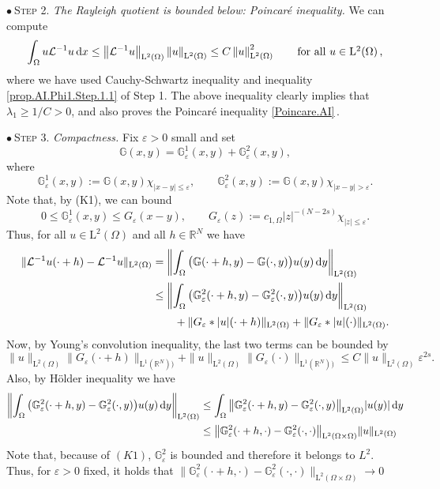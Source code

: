 \documentclass[11pt]{article}
\numberwithin{equation}{section}
\newcommand{\dx}{\,{\rm d}x}
\newcommand{\dy}{\,{\rm d}y}
\def\LL{\mathrm{L}} %
\newcommand{\AI}{\mathcal{L}^{-1}}
\newcommand{\K}{{\mathbb G}}
\newcommand{\ve}{\varepsilon}
\begin{document}
\noindent$\bullet~$\textsc{Step 2. }\textit{The Rayleigh quotient is bounded below: Poincar\'e inequality. }We can compute
\begin{equation}\label{prop.AI.Phi1.Step.1.5b}
\int_\Omega u\AI u\dx\le \left\|\AI u\right\|_{\LL^2(\Omega)} \left\|  u\right\|_{\LL^2(\Omega)} \le C  \left\|  u\right\|_{\LL^2(\Omega)}^2\qquad\mbox{for all $u\in\LL^2(\Omega)$\,,}
\end{equation}
where we have used Cauchy-Schwartz inequality and inequality \eqref{prop.AI.Phi1.Step.1.1} of Step 1.
The above inequality clearly implies that $\lambda_1\ge 1/C>0$, and also proves the Poincar\'e inequality \eqref{Poincare.AI}\,.

\noindent$\bullet~$\textsc{Step 3. }\textit{Compactness. }
Fix $\ve>0$ small and set
$$
\K(x,y)=\K_\ve^1(x,y)+\K_\ve^2(x,y),
$$
where
$$
\K_\ve^1(x,y):=\K(x,y)\chi_{|x-y|\leq \ve},\qquad
\K_\ve^2(x,y):=\K(x,y)\chi_{|x-y|> \ve}.
$$
Note that, by (K1), we can bound
$$
0\leq \K_\ve^1(x,y)\leq G_\ve(x-y),\qquad
G_\ve(z):=c_{1,\Omega}|z|^{-(N-2s)}\chi_{|z|\leq \ve}.
$$
Thus,
for all $u\in \LL^2(\Omega)$ and all $h \in \mathbb R^N$ we have
\begin{equation}\begin{split}\label{step4.Phi.n}
\|\AI u(\cdot+h)-\AI u \|_{\LL^2(\Omega)}&
=\biggl\|\int_{\Omega}\big(\K(\cdot+h,y)-\K(\cdot,y)\big) u(y)\dy\biggr\|_{\LL^2(\Omega)}\\
&\leq \biggl\|\int_{\Omega}\big(\K_\ve^2(\cdot+h,y)-\K_\ve^2(\cdot,y)\big) u(y)\dy\biggr\|_{\LL^2(\Omega)}\\
&\qquad
+\|G_\ve\ast |u|(\cdot +h)\|_{\LL^2(\Omega)}
+\|G_\ve\ast |u|(\cdot)\|_{\LL^2(\Omega)}.
\end{split}
\end{equation}
Now, by Young's convolution inequality, the last two terms can be bounded by
$$
\|u\|_{\LL^2(\Omega)}\|G_\ve(\cdot +h)\|_{\LL^1(\mathbb R^N))}
+\|u\|_{\LL^2(\Omega)}\|G_\ve(\cdot)\|_{\LL^1(\mathbb R^N))}\leq C\|u\|_{\LL^2(\Omega)}\ve^{2s}.
$$
Also, by H\"older inequality we have
\begin{align*}
\biggl\|\int_{\Omega}\big(\K_\ve^2(\cdot+h,y)-\K_\ve^2(\cdot,y)\big) u(y)\dy\biggr\|_{\LL^2(\Omega)}&
\leq \int_{\Omega}\big\|\K_\ve^2(\cdot+h,y)-\K_\ve^2(\cdot,y)\big\|_{\LL^2(\Omega)} |u(y)|\dy\\
&\leq \big\|\K_\ve^2(\cdot+h,\cdot)-\K_\ve^2(\cdot,\cdot)\big\|_{\LL^2(\Omega\times \Omega)} \|u\|_{\LL^2(\Omega)}
\end{align*}
Note that, because of $(K1)$,
 $\K_\ve^2$ is bounded and therefore it belongs to $L^2$. Thus, for $\ve>0$ fixed, it holds that $\big\|\K_\ve^2(\cdot+h,\cdot)-\K_\ve^2(\cdot,\cdot)\big\|_{\LL^2(\Omega\times \Omega)}\to 0$
\end{document}
